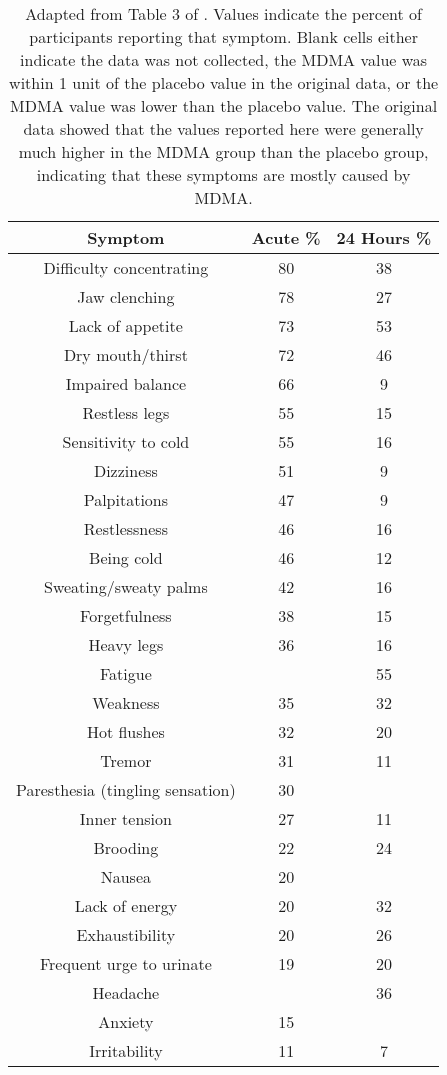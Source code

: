 \documentclass[12pt,letterpaper]{book}
\begin{document}
\begin{table}[htbp]
    \centering
    \caption{Adapted from Table 3 of \textcite{liechtiGender}. Values indicate the percent of participants reporting that symptom. Blank cells either indicate the data was not collected, the MDMA value was within 1 unit of the placebo value in the original data, or the MDMA value was lower than the placebo value. The original data showed that the values reported here were generally much higher in the MDMA group than the placebo group, indicating that these symptoms are mostly caused by MDMA.}
    \label{table:sideeffects}
    \begin{tabular}{|c|c|c|}
    \hline
    \textbf{Symptom} & \textbf{Acute \%} & \textbf{24 Hours \%} \\ \hline
        Difficulty concentrating & 80 & 38 \\
        Jaw clenching            & 78 & 27 \\
        Lack of appetite         & 73 & 53 \\
        Dry mouth/thirst         & 72 & 46 \\
        Impaired balance         & 66 & 9  \\
        Restless legs            & 55 & 15 \\
        Sensitivity to cold      & 55 & 16 \\
        Dizziness                & 51 & 9  \\
        Palpitations             & 47 & 9  \\
        Restlessness             & 46 & 16 \\
        Being cold               & 46 & 12 \\
        Sweating/sweaty palms    & 42 & 16 \\
        Forgetfulness            & 38 & 15 \\
        Heavy legs               & 36 & 16 \\
        Fatigue                  &    & 55 \\
        Weakness                 & 35 & 32 \\
        Hot flushes              & 32 & 20 \\
        Tremor                   & 31 & 11 \\
        Paresthesia (tingling sensation)              & 30 &    \\
        Inner tension            & 27 & 11 \\
        Brooding                 & 22 & 24 \\
        Nausea                   & 20 &    \\
        Lack of energy           & 20 & 32 \\
        Exhaustibility           & 20 & 26 \\
        Frequent urge to urinate & 19 & 20 \\
        Headache                 &    & 36 \\
        Anxiety                  & 15 &    \\
        Irritability             & 11 & 7  \\
        \hline
    \end{tabular}
\end{table}
\FloatBarrier
\end{document}
